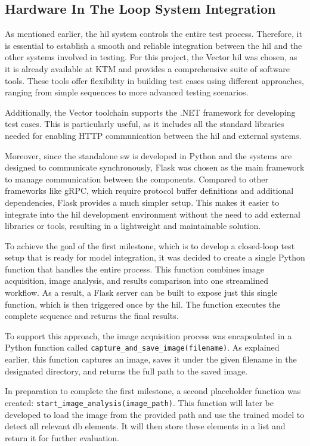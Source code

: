 \subsection{Hardware In The Loop System Integration}
As mentioned earlier, the \gls{hil} system controls the entire test process. Therefore, it is essential to establish a smooth and reliable integration between the \gls{hil} and the other systems involved in testing. For this project, the Vector \gls{hil} was chosen, as it is already available at KTM and provides a comprehensive suite of software tools. These tools offer flexibility in building test cases using different approaches, ranging from simple sequences to more advanced testing scenarios.

Additionally, the Vector toolchain supports the .NET framework for developing test cases. This is particularly useful, as it includes all the standard libraries needed for enabling HTTP communication between the \gls{hil} and external systems.

Moreover, since the standalone \gls{sw} is developed in Python and the systems are designed to communicate synchronously, Flask was chosen as the main framework to manage communication between the components. Compared to other frameworks like gRPC, which require protocol buffer definitions and additional dependencies, Flask provides a much simpler setup. This makes it easier to integrate into the \gls{hil} development environment without the need to add external libraries or tools, resulting in a lightweight and maintainable solution.

To achieve the goal of the first milestone, which is to develop a closed-loop test setup that is ready for model integration, it was decided to create a single Python function that handles the entire process. This function combines image acquisition, image analysis, and results comparison into one streamlined workflow. As a result, a Flask server can be built to expose just this single function, which is then triggered once by the \gls{hil}. The function executes the complete sequence and returns the final results. 

To support this approach, the image acquisition process was encapsulated in a Python function called \texttt{capture\_and\_save\_image(filename)}. As explained earlier, this function captures an image, saves it under the given filename in the designated directory, and returns the full path to the saved image.

In preparation to complete the first milestone, a second placeholder function was created: \texttt{start\_image\_analysis(image\_path)}. This function will later be developed to load the image from the provided path and use the trained model to detect all relevant \gls{db} elements. It will then store these elements in a list and return it for further evaluation.

